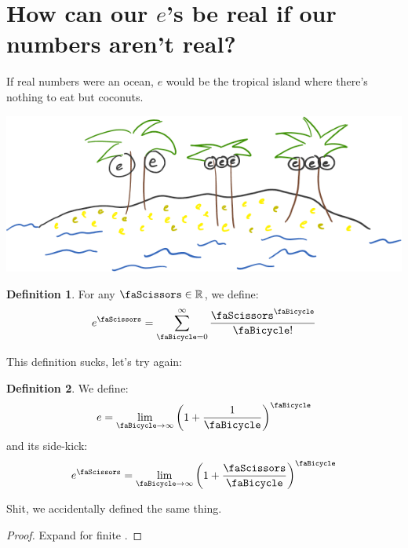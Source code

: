 \documentclass[12pt,a4paper]{amsart}
\theoremstyle{definition}
\newtheorem*  {Definition} {Definition}
\theoremstyle{remark}
\def \R{\mathbb{R}}
\begin{document}
\section{How can our $e$'s be real if our numbers aren't real?}
If real numbers were an ocean, $e$ would be the tropical island where 
there's nothing to eat but coconuts.
\begin{center}
  \includegraphics[width=.6\linewidth]{eIsland.png}
\end{center}
\begin{Definition}
  For any $\text{\faScissors}\in \R$, we define:
  \begin{align*}
    e^{\text{\faScissors}}=
    \sum_{\text{\faBicycle}=0}^{\infty} 
    \frac{\text{\faScissors}^{\text{\faBicycle}}}
    {\text{\faBicycle}!}
  \end{align*}
\end{Definition}
This definition sucks, let's try again:
\begin{Definition} We define:
  \begin{align*}
    e=\lim_{\text{\faBicycle}\to\infty}
    \left(1+\frac{1}{\text{\faBicycle}}\right)^{\text{\faBicycle}}
  \end{align*}
  and its side-kick:
  \begin{align*}
    e^{\text{\faScissors}}=\lim_{\text{\faBicycle}\to\infty}
    \left(1+\frac{\text{\faScissors}}
    {\text{\faBicycle}}\right)^{\text{\faBicycle}}
  \end{align*}
\end{Definition}
Shit, we accidentally defined the same thing.
\begin{proof}
  Expand for finite \faBicycle.
\end{proof}
\newpage
\end{document}

